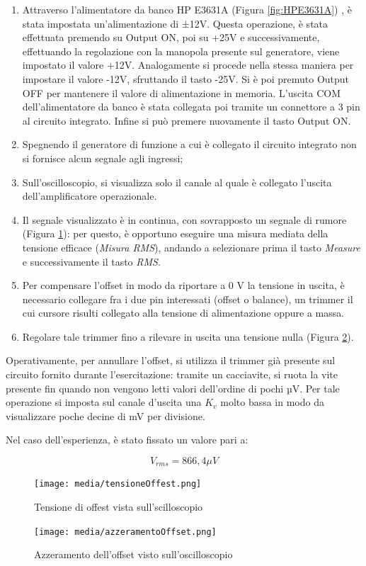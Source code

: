 \begin{enumerate}
    \item Attraverso l'alimentatore da banco HP E3631A (Figura \ref{fig:HPE3631A}) , è stata impostata un'alimentazione di ±12V. Questa operazione, è stata effettuata premendo su Output ON, poi  su +25V e successivamente, effettuando la regolazione con la manopola presente sul generatore, viene impostato il valore +12V. Analogamente si procede nella stessa maniera per impostare il valore -12V, sfruttando il tasto -25V.  Si è poi premuto Output OFF per mantenere il valore di alimentazione in memoria. L'uscita COM dell'alimentatore da banco è stata collegata poi tramite un connettore a 3 pin al circuito integrato. Infine si può premere nuovamente il tasto Output ON. 
    \item Spegnendo il generatore di funzione a cui è collegato il circuito integrato non si fornisce alcun segnale agli ingressi;
    \item  Sull’oscilloscopio, si visualizza solo il canale al quale è collegato l’uscita dell’amplificatore operazionale.
    \item  Il segnale visualizzato è in continua, con sovrapposto un segnale di rumore (Figura \ref{fig:tensioneOffset}): per questo, è opportuno eseguire una misura mediata della tensione efficace (\textit{Misura RMS}), andando a selezionare prima il tasto \textit{Measure} e successivamente il tasto \textit{RMS}.
    \item  Per compensare l’offset in modo da riportare a 0 V la tensione in uscita, è necessario collegare fra i due pin interessati (offset o balance), un trimmer il cui cursore risulti collegato alla tensione di alimentazione oppure a massa.
    \item Regolare tale trimmer fino a rilevare in uscita una tensione nulla (Figura \ref{fig:azzeramentoOffset}). 
\end{enumerate}

Operativamente, per annullare l’offset, si utilizza il trimmer già presente sul circuito fornito durante l’esercitazione: tramite un cacciavite, si ruota la vite presente fin quando non vengono letti valori dell’ordine di pochi µV.  Per tale operazione si imposta  sul canale d'uscita una  $K_v$ molto bassa in modo da visualizzare  poche decine di mV per divisione.
  
Nel caso dell'esperienza, è stato fissato un valore pari a:

\[V_{rms}=866,4 \mu V\]
\FloatBarrier
\begin{figure}
    \centering
    \texttt{[image: media/tensioneOffest.png]}
    \caption{Tensione di offest vista sull'scilloscopio}
    \label{fig:tensioneOffset}
\end{figure}
\begin{figure}
    \centering
    \texttt{[image: media/azzeramentoOffset.png]}
    \caption{Azzeramento dell'offset visto sull'oscilloscopio}
    \label{fig:azzeramentoOffset}
\end{figure}
\FloatBarrier

